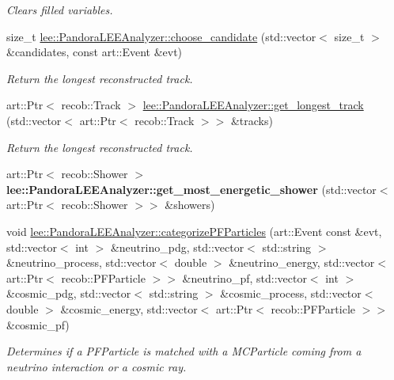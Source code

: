 \begin{DoxyCompactItemize}
\begin{DoxyCompactList}\small\item\em Clears filled variables. \end{DoxyCompactList}\item 
size\-\_\-t \hyperlink{group__lee_ga2598c705e4307eed73e1989613028ced}{lee\-::\-Pandora\-L\-E\-E\-Analyzer\-::choose\-\_\-candidate} (std\-::vector$<$ size\-\_\-t $>$ \&candidates, const art\-::\-Event \&evt)
\begin{DoxyCompactList}\small\item\em Return the longest reconstructed track. \end{DoxyCompactList}\item 
art\-::\-Ptr$<$ recob\-::\-Track $>$ \hyperlink{group__lee_gae76ba045ee298f69ff19ab86be51a69e}{lee\-::\-Pandora\-L\-E\-E\-Analyzer\-::get\-\_\-longest\-\_\-track} (std\-::vector$<$ art\-::\-Ptr$<$ recob\-::\-Track $>$$>$ \&tracks)
\begin{DoxyCompactList}\small\item\em Return the longest reconstructed track. \end{DoxyCompactList}\item 
\hypertarget{group__lee_gaf6eb7dd67f871231011dbfae2dcf6cfc}{art\-::\-Ptr$<$ recob\-::\-Shower $>$ {\bfseries lee\-::\-Pandora\-L\-E\-E\-Analyzer\-::get\-\_\-most\-\_\-energetic\-\_\-shower} (std\-::vector$<$ art\-::\-Ptr$<$ recob\-::\-Shower $>$$>$ \&showers)}\label{group__lee_gaf6eb7dd67f871231011dbfae2dcf6cfc}

\item 
void \hyperlink{group__lee_gae0e0369a28fcbca90d62624f59d44aaa}{lee\-::\-Pandora\-L\-E\-E\-Analyzer\-::categorize\-P\-F\-Particles} (art\-::\-Event const \&evt, std\-::vector$<$ int $>$ \&neutrino\-\_\-pdg, std\-::vector$<$ std\-::string $>$ \&neutrino\-\_\-process, std\-::vector$<$ double $>$ \&neutrino\-\_\-energy, std\-::vector$<$ art\-::\-Ptr$<$ recob\-::\-P\-F\-Particle $>$$>$ \&neutrino\-\_\-pf, std\-::vector$<$ int $>$ \&cosmic\-\_\-pdg, std\-::vector$<$ std\-::string $>$ \&cosmic\-\_\-process, std\-::vector$<$ double $>$ \&cosmic\-\_\-energy, std\-::vector$<$ art\-::\-Ptr$<$ recob\-::\-P\-F\-Particle $>$$>$ \&cosmic\-\_\-pf)
\begin{DoxyCompactList}\small\item\em Determines if a P\-F\-Particle is matched with a M\-C\-Particle coming from a neutrino interaction or a cosmic ray. \end{DoxyCompactList}\end{DoxyCompactItemize}
